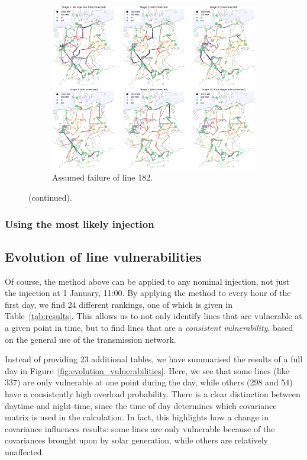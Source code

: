\documentclass[main.tex]{subfiles}
\begin{document}
\begin{figure}[ht]
\renewcommand\figurename{Interactive Figure}
\ContinuedFloat
\begin{subfigure}{\textwidth}
    \centering
    \includegraphics[width=\textwidth]{img/master_with_cov_182.pdf}
    \caption{Assumed failure of line 182.}\label{ifig:master182}
\end{subfigure}
%
    \caption{(continued).}\label{ifig:master}
\end{figure}

\subsubsection{Using the most likely injection}


\subsection{Evolution of line vulnerabilities}\label{sec:evolution}
Of course, the method above can be applied to any nominal injection, not just the injection at 1 January, 11:00. By applying the method to every hour of the first day, we find 24 different rankings, one of which is given in Table~\ref{tab:results}. This allows us to not only identify lines that are vulnerable at a given point in time, but to find lines that are a \emph{consistent vulnerability}, based on the general use of the transmission network.

Instead of providing 23 additional tables, we have summarised the results of a full day in Figure~\ref{fig:evolution_vulnerabilities}. Here, we see that some lines (like 337) are only vulnerable at one point during the day, while others (298 and 54) have a consistently high overload probability. There is a clear distinction between daytime and night-time, since the time of day determines which covariance matrix is used in the calculation. In fact, this highlights how a change in covariance influences results: some lines are only vulnerable because of the covariances brought upon by solar generation, while others are relatively unaffected.
\end{document}
